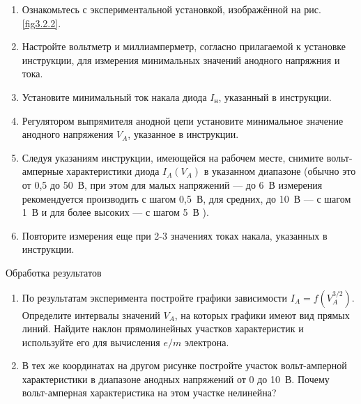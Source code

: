 \begin{enumerate}

\item{ Ознакомьтесь с экспериментальной установкой, изображённой на рис. \ref{fig3.2.2}.}

\item{Настройте вольтметр и миллиамперметр, согласно прилагаемой к установке инструкции, для измерения минимальных значений анодного напряжния и тока.}

\item{ Установите минимальный  ток накала диода $I_{н}$, указанный в инструкции.}

\item{ Регулятором выпрямителя анодной цепи установите минимальное значение анодного напряжения $V_{A}$, указанное в инструкции.}

\item{ Следуя указаниям инструкции, имеющейся на рабочем месте, снимите вольт-амперные характеристики диода $I_{A}(V_{A})$ в указанном диапазоне (обычно это от 0,5 до 50~В, при этом для малых напряжений  --- до 6~В измерения рекомендуется производить с шагом 0,5~В, для средних, до 10~В --- с шагом 1~В и для более высоких --- с шагом 5~В ).}

\item{ Повторите измерения еще при 2-3 значениях токах накала, указанных в инструкции.}
\end{enumerate}

{\rm Обработка результатов}
\begin{enumerate}
\item{ По результатам эксперимента постройте графики зависимости $I_A=f(V_{A}^{3/2})$. Определите интервалы значений $V_{A}$, на которых графики имеют вид прямых линий. Найдите  наклон прямолинейных участков характеристик и используйте его для вычисления $e/m$ электрона.}
\item{ В тех же координатах на другом рисунке постройте участок вольт-амперной характеристики в диапазоне анодных напряжений от 0 до 10~В. Почему вольт-амперная характеристика на этом участке нелинейна?}
\end{enumerate}


